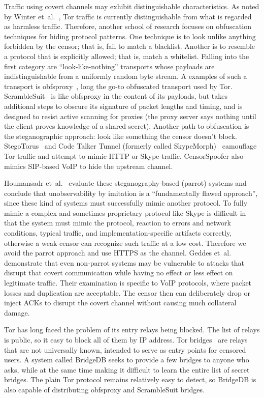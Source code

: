 \documentclass{article}
\begin{document}
Traffic using covert channels may exhibit distinguishable characteristics. As
noted by Winter et~al.~\cite{foci12-winter}, Tor traffic is currently
distinguishable from what is regarded as harmless traffic. Therefore, another school of research focuses on obfuscation
techniques for hiding protocol patterns. One technique is to look unlike
anything forbidden by the censor; that is, fail to match a blacklist. Another is
to resemble a protocol that is explicitly allowed; that is, match a whitelist.
Falling into the first category are ``look-like-nothing'' transports whose
payloads are indistinguishable from a uniformly random byte stream. A examples
of such a transport is obfsproxy~\cite{obfsproxy}, long the go-to obfuscated
transport used by Tor. ScrambleSuit~\cite{scramblesuit} is like obfsproxy in the
content of its payloads, but takes additional steps to obscure its signature of
packet lengths and timing, and is designed to resist active scanning for proxies
(the proxy server says nothing until the client proves knowledge of a shared
secret). Another path to obfuscation is the steganographic approach: look like
something the censor doesn't block. StegoTorus~\cite{stegotorus} and Code Talker
Tunnel (formerly called SkypeMorph)~\cite{skypemorph} camouflage Tor traffic and
attempt to mimic HTTP or Skype traffic. CensorSpoofer also mimics SIP-based VoIP
to hide the upstream channel.

Houmansadr et~al.~\cite{parrot} evaluate these steganography-based (parrot)
systems and conclude that unobservability by imitation is a ``fundamentally
flawed approach'', since these kind of systems must successfully mimic another
protocol. To fully mimic a complex and sometimes proprietary protocol like Skype
is difficult in that the system must mimic the protocol,  reaction to errors and
network conditions, typical traffic, and implementation-specific artifacts
correctly, otherwise a weak censor can recognize such traffic at a low cost.
Therefore we avoid the parrot approach and use HTTPS as the channel. Geddes et~al.~\cite{acks}
demonstrate that even non-parrot systems may be vulnerable to
attacks that disrupt that covert communication while having no effect or less
effect on legitimate traffic. Their examination is specific to VoIP protocols,
where packet losses and duplication are acceptable. The censor then can
deliberately drop or inject ACKs to disrupt the covert channel without causing
much collateral damage.

Tor has long faced the problem of its entry relays being blocked. The list of
relays is public, so it easy to block all of them by IP address. Tor
bridges~\cite{tor-blocking} are relays that are not universally known, intended
to serve as entry points for censored users. A system called BridgeDB seeks to
provide a few bridges to anyone who asks, while at the same time making it
difficult to learn the entire list of secret bridges. The plain Tor protocol
remains relatively easy to detect, so BridgeDB is also capable of distributing
obfsproxy and ScrambleSuit bridges.
\end{document}
